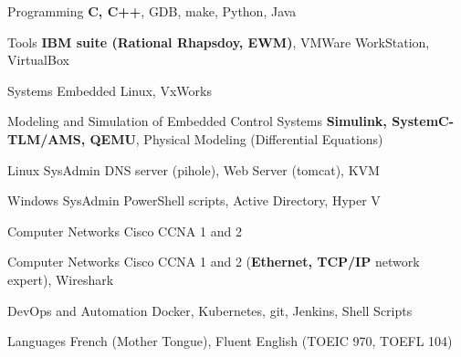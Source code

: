 

\begin{cvskills}
{

    \cvskill
    {Programming} %
    {\textbf{C, C++}, GDB, make, Python, Java} %

    \cvskill
    {Tools}
    {\textbf{IBM suite (Rational Rhapsdoy, EWM)}, VMWare WorkStation, VirtualBox}
	
	\cvskill
    {Systems}
    {Embedded Linux, VxWorks}
	
    \cvskill
    {Modeling and Simulation of Embedded Control Systems} %
    {\textbf{Simulink, SystemC-TLM/AMS, QEMU}, Physical Modeling (Differential Equations)} %

	}{}
{

    \cvskill
    {Linux SysAdmin} %
    {DNS server (pihole), Web Server (tomcat), KVM} %

    \cvskill
    {Windows SysAdmin} %
    {PowerShell scripts, Active Directory, Hyper V} %

    \cvskill
    {Computer Networks} %
    {Cisco CCNA 1 and 2} %

}{}
    \cvskill
    {Computer Networks} %
    {Cisco CCNA 1 and 2 (\textbf{Ethernet, TCP/IP} network expert), Wireshark} %

    \cvskill
    {DevOps and Automation} %
    {Docker, Kubernetes, git, Jenkins, Shell Scripts} %

    \cvskill
    {Languages} %
    {French (Mother Tongue), Fluent English (TOEIC 970, TOEFL 104)} %

\end{cvskills}
